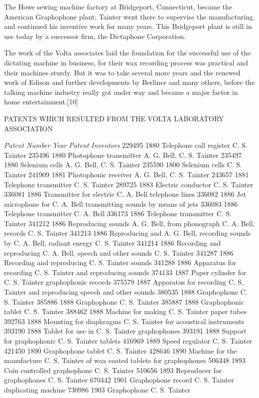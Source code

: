 \documentclass[12pt,oneside]{scrbook}
\begin{document}
  The Howe sewing machine factory at Bridgeport, Connecticut, became the
  American Graphophone plant; Tainter went there to supervise the
  manufacturing, and continued his inventive work for many years. This
  Bridgeport plant is still in use today by a successor firm, the
  Dictaphone Corporation.
  
  The work of the Volta associates laid the foundation for the successful
  use of the dictating machine in business, for their wax recording
  process was practical and their machines sturdy. But it was to take
  several more years and the renewed work of Edison and further
  developments by Berliner and many others, before the talking machine
  industry really got under way and became a major factor in home
  entertainment.{[}10{]}
  
  PATENTS WHICH RESULTED FROM THE VOLTA LABORATORY ASSOCIATION
  
  \emph{Patent Number} \emph{Year} \emph{Patent} \emph{Inventors} 229495
  1880 Telephone call register C. S. Tainter 235496 1880 Photophone
  transmitter A. G. Bell, C. S. Tainter 235497 1880 Selenium cells A. G.
  Bell, C. S. Tainter 235590 1800 Selenium cells C. S. Tainter 241909 1881
  Photophonic receiver A. G. Bell, C. S. Tainter 243657 1881 Telephone
  transmitter C. S. Tainter 289725 1883 Electric conductor C. S. Tainter
  336081 1886 Transmitter for electric C. A. Bell telephone lines 336082
  1886 Jet microphone for C. A. Bell transmitting sounds by means of jets
  336083 1886 Telephone transmitter C. A. Bell 336173 1886 Telephone
  transmitter C. S. Tainter 341212 1886 Reproducing sounds A. G. Bell,
  from phonograph C. A. Bell, records C. S. Tainter 341213 1886
  Reproducing and A. G. Bell, recording sounds by C. A. Bell, radiant
  energy C. S. Tainter 341214 1886 Recording and reproducing C. A. Bell,
  speech and other sounds C. S. Tainter 341287 1886 Recording and
  reproducing C. S. Tainter sounds 341288 1886 Apparatus for recording C.
  S. Tainter and reproducing sounds 374133 1887 Paper cylinder for C. S.
  Tainter graphophonic records 375579 1887 Apparatus for recording C. S.
  Tainter and reproducing speech and other sounds 380535 1888 Graphophone
  C. S. Tainter 385886 1888 Graphophone C. S. Tainter 385887 1888
  Graphophonic tablet C. S. Tainter 388462 1888 Machine for making C. S.
  Tainter paper tubes 392763 1888 Mounting for diaphragms C. S. Tainter
  for acoustical instruments 393190 1888 Tablet for use in C. S. Tainter
  graphophones 393191 1888 Support for graphophonic C. S. Tainter tablets
  416969 1889 Speed regulator C. S. Tainter 421450 1890 Graphophone tablet
  C. S. Tainter 428646 1890 Machine for the manufacture C. S. Tainter of
  wax coated tablets for graphophones 506348 1893 Coin controlled
  graphophone C. S. Tainter 510656 1893 Reproducer for graphophones C. S.
  Tainter 670442 1901 Graphophone record C. S. Tainter duplicating machine
  730986 1903 Graphophone C. S. Tainter
  
\end{document}
